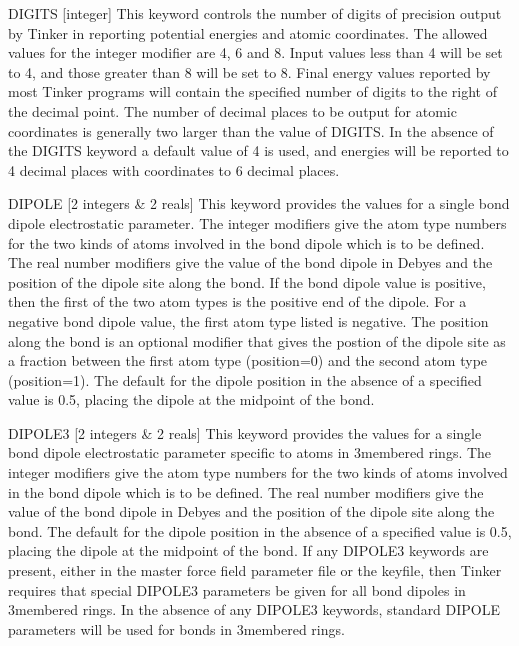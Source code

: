 \documentclass[letterpaper,11pt,english]{sphinxmanual}
\begin{document}
DIGITS {[}integer{]}     This keyword controls the number of digits of precision  output by Tinker in reporting potential energies and atomic coordinates. The allowed values for the integer modifier are 4, 6 and 8. Input values less than 4 will be set to 4, and those greater than 8 will be set to 8. Final energy values reported by most Tinker programs will contain the specified number of digits to the right of the decimal point. The number of decimal places to be output for atomic coordinates is generally two larger than the value of DIGITS. In the absence of the DIGITS keyword a default value of 4 is used, and  energies will be reported to 4 decimal places with coordinates to 6 decimal places.

DIPOLE {[}2 integers \& 2 reals{]}     This keyword provides the values for a single bond dipole electrostatic parameter. The integer modifiers give the atom type numbers for the two kinds of atoms involved in the bond dipole which is to be defined. The real number modifiers give the value of the bond dipole in Debyes and the position of the dipole site along the bond. If the bond dipole value is positive, then the first of the two atom types is the positive end of the dipole. For a negative bond dipole value, the first atom type listed is negative. The position along the bond is an optional modifier that gives the postion of the dipole site as a fraction between the first atom type (position=0) and the second atom type (position=1). The default for the dipole position in the absence of a specified value is 0.5, placing the dipole at the midpoint of the bond.

DIPOLE3 {[}2 integers \& 2 reals{]}     This keyword provides the values for a single bond dipole electrostatic parameter specific to atoms in 3\sphinxhyphen{}membered rings. The integer modifiers give the atom type numbers for the two kinds of atoms involved in the bond dipole which is to be defined. The real number modifiers give the value of the bond dipole in Debyes and the position of the dipole site along the bond. The default for the dipole position in the absence of a specified value is 0.5, placing the dipole at the midpoint of the bond. If any DIPOLE3 keywords are present, either in the master force field parameter file or the keyfile, then Tinker requires that special DIPOLE3 parameters be given for all bond dipoles in 3\sphinxhyphen{}membered rings. In the absence of any DIPOLE3 keywords, standard DIPOLE parameters will be used for bonds in 3\sphinxhyphen{}membered rings.
\end{document}
